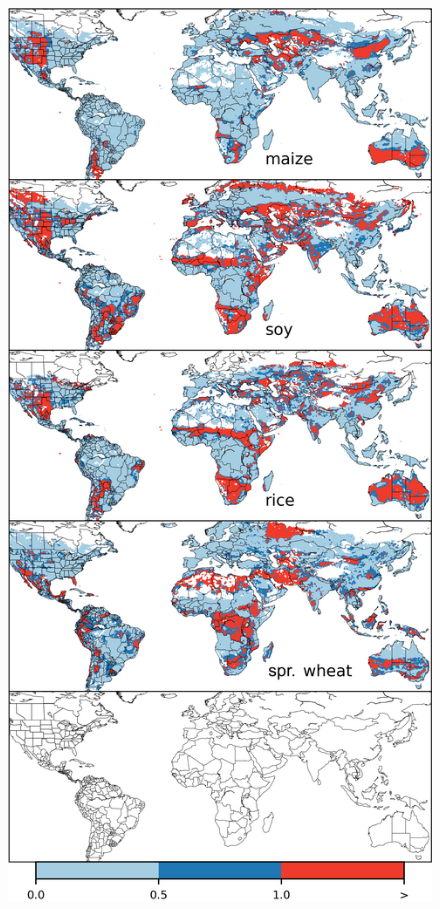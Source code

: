\documentclass[10pt]{article}
\begin{document}
\clearpage
\begin{figure}[h!]
\centering
\begin{minipage}{.45\textwidth}
\centering
\includegraphics[width=\textwidth]{s_em_err_JULES.png}\\

\end{minipage}
\end{figure}
\end{document}
